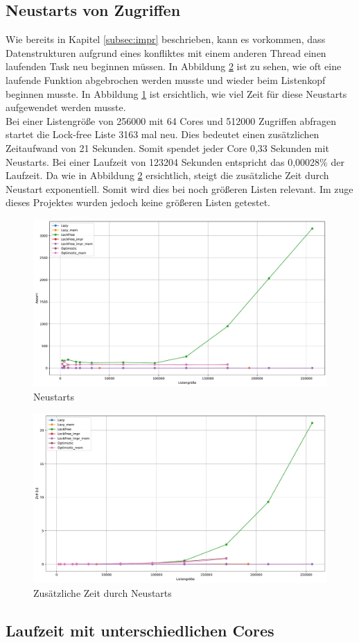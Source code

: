 \subsection{Neustarts von Zugriffen}
Wie bereits in Kapitel \ref{subsec:impr} beschrieben, kann es vorkommen, dass Datenstrukturen aufgrund eines konfliktes mit einem anderen
Thread einen laufenden Task neu beginnen müssen. 
In Abbildung \ref{fig:mixed_lostTime} ist zu sehen, wie oft eine laufende Funktion abgebrochen werden musste und wieder beim Listenkopf beginnen musste. 
In Abbildung \ref{fig:mixed_goToStart} ist ersichtlich, wie viel Zeit für diese Neustarts aufgewendet werden musste. \\
Bei einer Listengröße von 256000 mit 64 Cores und 512000 Zugriffen abfragen startet die Lock-free Liste 3163 mal neu. Dies bedeutet
einen zusätzlichen Zeitaufwand von 21 Sekunden. Somit spendet jeder Core 0,33 Sekunden mit Neustarts. Bei einer Laufzeit von 123204 Sekunden 
entspricht das 0,00028\% der Laufzeit. Da wie in Abbildung \ref{fig:mixed_lostTime} ersichtlich, steigt die zusätzliche Zeit durch Neustart exponentiell.
Somit wird dies bei noch größeren Listen relevant. Im zuge dieses Projektes wurden jedoch keine größeren Listen getestet. 

\begin{figure}[ht!]
	\centering
	\includegraphics[width=1.0\linewidth]{./plots_pdf/mixed_goToStart.pdf} 
	\caption{Neustarts}
	\label{fig:mixed_goToStart} 
\end{figure}

\begin{figure}[ht!]
	\centering
	\includegraphics[width=1.0\linewidth]{./plots_pdf/mixed_lostTime.pdf} 
	\caption{Zusätzliche Zeit durch Neustarts}
	\label{fig:mixed_lostTime} 
\end{figure}

\subsection{Laufzeit mit unterschiedlichen Cores}